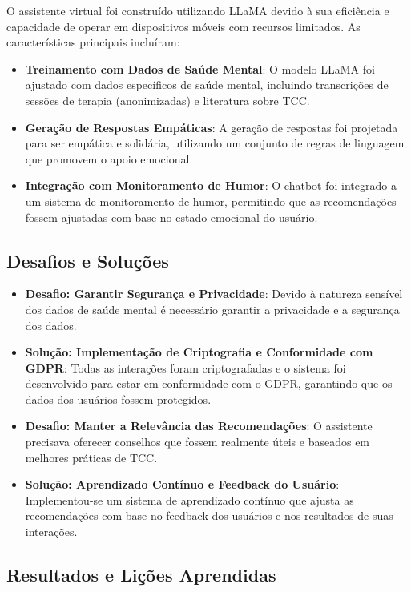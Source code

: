 \documentclass[14pt,a4paper,oneside]{book}
\begin{document}
O assistente virtual foi construído utilizando LLaMA devido à sua eficiência e capacidade de operar em dispositivos móveis com recursos limitados. As características principais incluíram:

\begin{itemize}
	\item \textbf{Treinamento com Dados de Saúde Mental}: O modelo LLaMA foi ajustado com dados específicos de saúde mental, incluindo transcrições de sessões de terapia (anonimizadas) e literatura sobre TCC.
	\item \textbf{Geração de Respostas Empáticas}: A geração de respostas foi projetada para ser empática e solidária, utilizando um conjunto de regras de linguagem que promovem o apoio emocional.
	\item \textbf{Integração com Monitoramento de Humor}: O chatbot foi integrado a um sistema de monitoramento de humor, permitindo que as recomendações fossem ajustadas com base no estado emocional do usuário.
\end{itemize}

\subsection{Desafios e Soluções}

\begin{itemize}
	\item \textbf{Desafio: Garantir Segurança e Privacidade}: Devido à natureza sensível dos dados de saúde mental é necessário garantir a privacidade e a segurança dos dados.
	\item \textbf{Solução: Implementação de Criptografia e Conformidade com GDPR}: Todas as interações foram criptografadas e o sistema foi desenvolvido para estar em conformidade com o GDPR, garantindo que os dados dos usuários fossem protegidos.
	\item \textbf{Desafio: Manter a Relevância das Recomendações}: O assistente precisava oferecer conselhos que fossem realmente úteis e baseados em melhores práticas de TCC.
	\item \textbf{Solução: Aprendizado Contínuo e Feedback do Usuário}: Implementou-se um sistema de aprendizado contínuo que ajusta as recomendações com base no feedback dos usuários e nos resultados de suas interações.
\end{itemize}

\subsection{Resultados e Lições Aprendidas}
\end{document}
